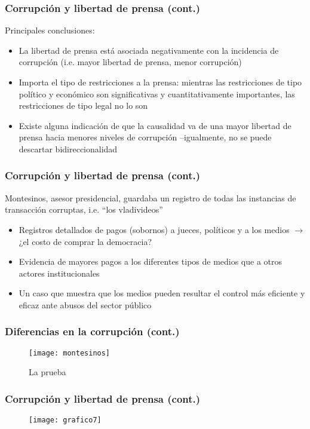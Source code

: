 \documentclass[handout,final,xcolor=dvipsnames]{beamer}
\begin{document}
\begin{frame}\frametitle{Corrupción y libertad de prensa (cont.)}
Principales conclusiones: \medskip 
\begin{itemize} \itemsep 10pt
\item La libertad de prensa está asociada negativamente con la incidencia de corrupción (i.e. mayor libertad de prensa, menor corrupción)
\item Importa el tipo de restricciones a la prensa: mientras las restricciones de tipo político y económico son significativas y cuantitativamente importantes, las restricciones de tipo legal no lo son
\item Existe alguna indicación de que la causalidad va de una mayor libertad de prensa hacia menores niveles de corrupción –igualmente, no se puede descartar bidireccionalidad
\end{itemize}
\end{frame}




\begin{frame}\frametitle{Corrupción y libertad de prensa (cont.)}
Montesinos, asesor presidencial, guardaba un registro de todas las instancias de transacción corruptas, i.e. ``los vladivideos'' \medskip 
\begin{itemize}\itemsep 10pt
\item Registros detallados de pagos (sobornos) a jueces, políticos y a los medios $\longrightarrow$ ¿el
costo de comprar la democracia?
\item Evidencia de mayores pagos a los diferentes tipos de medios que a otros actores
institucionales
\item Un caso que muestra que los medios pueden resultar el control más eficiente y eficaz ante abusos del sector público
\end{itemize}
\end{frame}


\begin{frame}\frametitle{Diferencias en la corrupción (cont.)}
\begin{figure}[htbp]
  \centering
  \texttt{[image: montesinos]}
  \caption{La prueba}
  \label{fig:kk}
\end{figure}
\end{frame}



\begin{frame}\frametitle{Corrupción y libertad de prensa (cont.)}
\begin{figure}[htbp]
    \centering
    \texttt{[image: grafico7]}
 \end{figure}
\end{frame}
\end{document}
